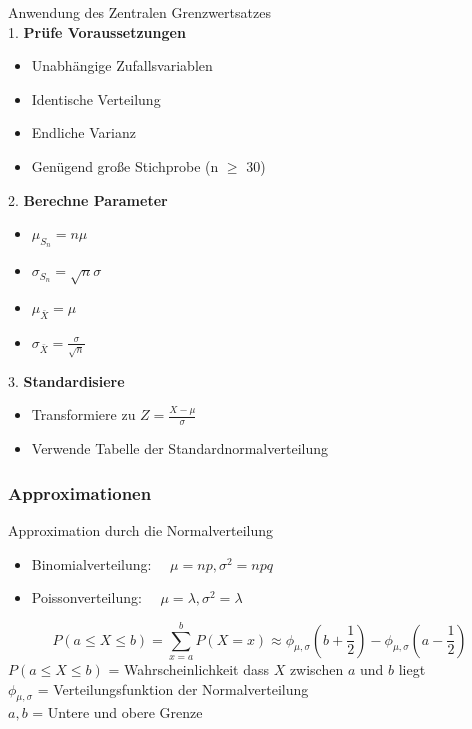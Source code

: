 \begin{KR}{Anwendung des Zentralen Grenzwertsatzes}\\
1. \textbf{Prüfe Voraussetzungen}
   \begin{itemize}
   \item Unabhängige Zufallsvariablen
   \item Identische Verteilung
   \item Endliche Varianz
   \item Genügend große Stichprobe (n $\geq$ 30)
   \end{itemize}

2. \textbf{Berechne Parameter}
   \begin{itemize}
   \item $\mu_{S_n} = n\mu$
   \item $\sigma_{S_n} = \sqrt{n}\sigma$
   \item $\mu_{\bar{X}} = \mu$
   \item $\sigma_{\bar{X}} = \frac{\sigma}{\sqrt{n}}$
   \end{itemize}

3. \textbf{Standardisiere}
   \begin{itemize}
   \item Transformiere zu $Z = \frac{X-\mu}{\sigma}$
   \item Verwende Tabelle der Standardnormalverteilung
   \end{itemize}
\end{KR}

\subsubsection{Approximationen}

\begin{concept}{Approximation durch die Normalverteilung}
\begin{itemize}
  \item Binomialverteilung: $\quad \mu=np, \sigma^2=npq$
  \item Poissonverteilung: $\quad \mu=\lambda, \sigma^2=\lambda$
\end{itemize}
$$
P(a \leq X \leq b)=\sum_{x=a}^{b} P(X=x) \approx \phi_{\mu,\sigma}(b+\frac{1}{2})-\phi_{\mu,\sigma}(a-\frac{1}{2})
$$
$P(a \leq X \leq b)$ = Wahrscheinlichkeit dass $X$ zwischen $a$ und $b$ liegt\\
$\phi_{\mu,\sigma}$ = Verteilungsfunktion der Normalverteilung\\
$a, b$ = Untere und obere Grenze\\
\end{concept}

